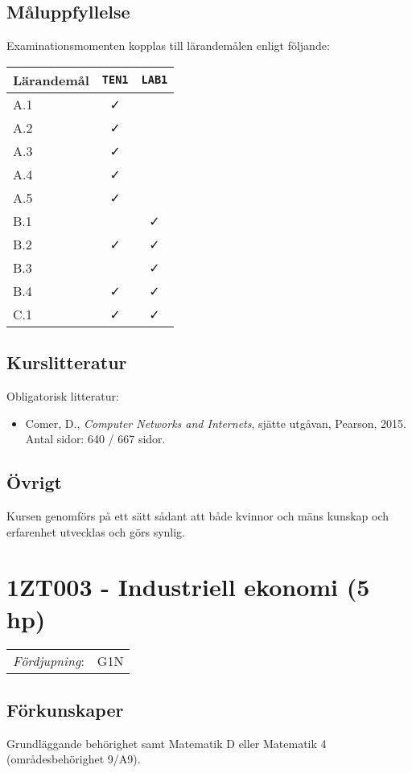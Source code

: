 \subsection*{Måluppfyllelse}

Examinationsmomenten kopplas till lärandemålen enligt följande:

\begin{longtable}[]{@{}lcc@{}}
\toprule
\textsf{Lärandemål} & \texttt{TEN1} & \texttt{LAB1}\tabularnewline
\midrule
\endhead
A.1 & \faCheck &\tabularnewline
A.2 & \faCheck &\tabularnewline
A.3 & \faCheck &\tabularnewline
A.4 & \faCheck &\tabularnewline
A.5 & \faCheck &\tabularnewline
B.1 & & \faCheck\tabularnewline
B.2 & \faCheck & \faCheck\tabularnewline
B.3 & & \faCheck\tabularnewline
B.4 & \faCheck & \faCheck\tabularnewline
C.1 & \faCheck & \faCheck\tabularnewline
\bottomrule
\end{longtable}

\subsection*{Kurslitteratur}

Obligatorisk litteratur:

\begin{itemize}
\tightlist
\item
  Comer, D., \emph{Computer Networks and Internets}, sjätte utgåvan,
  Pearson, 2015. Antal sidor: 640 / 667 sidor.
\end{itemize}

\subsection*{Övrigt}

Kursen genomförs på ett sätt sådant att både kvinnor och mäns kunskap och erfarenhet utvecklas och görs synlig.
\pagebreak
\section*{1ZT003 - Industriell ekonomi (5 hp)}

\begin{tabular}{ll}
\emph{Fördjupning}: & G1N\tabularnewline
\end{tabular}

\subsection*{Förkunskaper}

Grundläggande behörighet samt Matematik D eller Matematik 4
(områdesbehörighet 9/A9).

